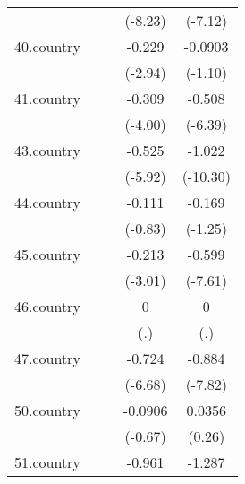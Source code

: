 {\begin{tabular}{l*{4}{c}}
            &                     &                     &     (-8.23)         &     (-7.12)         \\
[1em]
40.country  &                     &                     &      -0.229\sym{**} &     -0.0903         \\
            &                     &                     &     (-2.94)         &     (-1.10)         \\
[1em]
41.country  &                     &                     &      -0.309\sym{***}&      -0.508\sym{***}\\
            &                     &                     &     (-4.00)         &     (-6.39)         \\
[1em]
43.country  &                     &                     &      -0.525\sym{***}&      -1.022\sym{***}\\
            &                     &                     &     (-5.92)         &    (-10.30)         \\
[1em]
44.country  &                     &                     &      -0.111         &      -0.169         \\
            &                     &                     &     (-0.83)         &     (-1.25)         \\
[1em]
45.country  &                     &                     &      -0.213\sym{**} &      -0.599\sym{***}\\
            &                     &                     &     (-3.01)         &     (-7.61)         \\
[1em]
46.country  &                     &                     &           0         &           0         \\
            &                     &                     &         (.)         &         (.)         \\
[1em]
47.country  &                     &                     &      -0.724\sym{***}&      -0.884\sym{***}\\
            &                     &                     &     (-6.68)         &     (-7.82)         \\
[1em]
50.country  &                     &                     &     -0.0906         &      0.0356         \\
            &                     &                     &     (-0.67)         &      (0.26)         \\
[1em]
51.country  &                     &                     &      -0.961\sym{***}&      -1.287\sym{***}\\

\end{tabular}}
